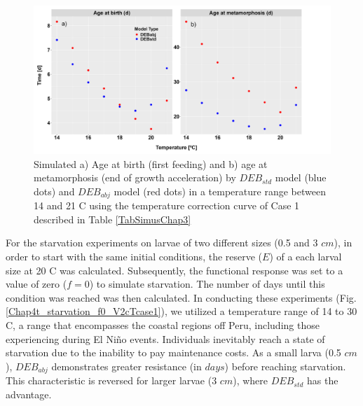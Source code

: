\begin{figure}[ht]
	\includegraphics[width=1.0\textwidth]{figures/Chap4age_transitions2SPcTcase1.png}
	\centering
	\caption{Simulated a) Age at birth (first feeding) and b) age at metamorphosis (end of growth acceleration) by $DEB_{std}$ model (blue dots) and $DEB_{abj}$ model (red dots) in a temperature range between 14 and 21 \textdegree C using the temperature correction curve of Case 1 described in Table \ref{TabSimusChap3}}
	\label{Chap4age_transitions2SPcTcase1}
\end{figure}

For the starvation experiments on larvae of two different sizes (0.5 and 3 $cm$), in order to start with the same initial conditions, the reserve ($E$) of a each larval size at 20 \textdegree C was calculated. Subsequently, the functional response was set to a value of zero ($f = 0$) to simulate starvation. The number of days until this condition was reached was then calculated. In conducting these experiments (Fig. \ref{Chap4t_starvation_f0_V2cTcase1}), we utilized a temperature range of 14 to 30 \textdegree C, a range that encompasses the coastal regions off Peru, including those experiencing during El Ni\~{n}o events. Individuals inevitably reach a state of starvation due to the inability to pay maintenance costs. As a small larva (0.5 $cm$), $DEB_{abj}$ demonstrates greater resistance (in $days$) before reaching starvation. This characteristic is reversed for larger larvae (3 $cm$), where $DEB_{std}$ has the advantage.

